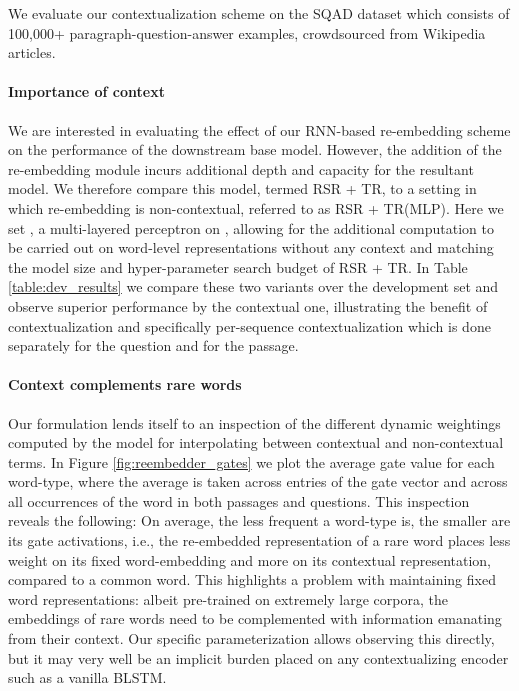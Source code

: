 \documentclass[11pt,a4paper]{article}
\newcommand{\squad}{\textsc{SQ\normalfont{u}AD}}
\newcommand{\bilstm}{\textsc{B\normalfont{i}LSTM}}
\newcommand{\rnn}{\textsc{RNN}}
\newcommand{\rasor}{\textsc{R\normalfont{a}S\normalfont{o}R}}
\newcommand{\tr}{\textsc{TR}}
\newcommand{\trMlp}{\textsc{TR(MLP)}}
\newcommand{\rasorTrLstm}{\rasor{} + \tr{}}
\newcommand{\rasorTrMlp}{\rasor{} + \trMlp{}}
\begin{document}
We evaluate our contextualization scheme on the \squad{} dataset \cite{rajpurkar2016} which consists of 100,000+  paragraph-question-answer examples, crowdsourced from Wikipedia articles.

\paragraph{Importance of context}
We are interested in evaluating the effect of our \rnn{}-based re-embedding scheme on the performance of the downstream base model. However, the addition of the re-embedding module incurs additional depth and capacity for the resultant model. We therefore compare this model, termed \rasorTrLstm{}, to a setting in which re-embedding is non-contextual, referred to as \rasorTrMlp{}. Here we set , a multi-layered perceptron on , allowing for the additional computation to be carried out on word-level representations without any context and matching the model size and hyper-parameter search budget of \rasorTrLstm{}.
In Table \ref{table:dev_results} we compare these two variants over the development set and observe superior performance by the contextual one, illustrating the benefit of contextualization and specifically per-sequence contextualization which is done separately for the question and for the passage.

\paragraph{Context complements rare words} Our formulation lends itself to an inspection of the different dynamic weightings computed by the model for interpolating between contextual and non-contextual terms. In Figure \ref{fig:reembedder_gates} we plot the average gate value  for each word-type, where the average is taken across entries of the gate vector and across all occurrences of the word in both passages and questions. This inspection reveals the following:
On average, the less frequent a word-type is, the smaller are its gate activations, i.e., the re-embedded representation of a rare word places less weight on its fixed word-embedding and more on its contextual representation, compared to a common word. This  highlights a problem with maintaining fixed word representations: albeit pre-trained on extremely large corpora, the embeddings of rare words need to be complemented with information emanating from their context. Our specific parameterization allows observing this directly, but it may very well be an implicit burden placed on any contextualizing encoder such as a vanilla \bilstm.
\end{document}

